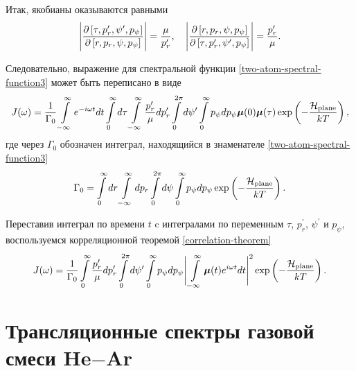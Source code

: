 Итак, якобианы оказываются равными
\begin{gather}
    \Bigg\vert \frac{\partial \left[ \tau, p_r^\prime, \psi^\prime, p_\psi \right]}{\partial \left[ r, p_r, \psi, p_\psi \right]} \Bigg\vert = \frac{\mu}{p_r^\prime}, \quad \Bigg\vert \frac{\partial \left[ r, p_r, \psi, p_\psi \right]}{\partial \left[ \tau, p_r^\prime, \psi^\prime, p_\psi \right]} \Bigg\vert = \frac{p_r^\prime}{\mu}.
\end{gather}

Следовательно, выражение для спектральной функции \eqref{two-atom-spectral-function3} может быть переписано в виде
\begin{gather}
    J(\omega) = \frac{1}{\Gamma_0} \int\limits_{-\infty}^\infty e^{-i \omega t} dt \int\limits_0^\infty d\tau \int\limits_{-\infty}^\infty \frac{p_r^\prime}{\mu} dp_r^\prime \int\limits_0^{2\pi} d\psi^\prime \int\limits_0^\infty p_\psi dp_\psi \boldsymbol{\mu}(0) \boldsymbol{\mu}(\tau) \exp \left( -\frac{\mathcal{H}_\text{plane}}{kT} \right),
\end{gather}
%
где через $\Gamma_0$ обозначен интеграл, находящийся в знаменателе \eqref{two-atom-spectral-function3}
\begin{gather}
    \Gamma_0 = \int\limits_0^\infty dr \int\limits_{-\infty}^\infty dp_r \int\limits_0^{2\pi} d\psi \int\limits_0^\infty p_\psi dp_\psi \exp \left( -\frac{\mathcal{H}_\text{plane}}{kT} \right).
\end{gather}

Переставив интеграл по времени $t$ c интегралами по переменным $\tau$, $p_r^\prime$, $\psi^\prime$ и $p_\psi$, воспользуемся корреляционной теоремой \eqref{correlation-theorem}
\begin{gather}
    J(\omega) = \frac{1}{\Gamma_0} \int\limits_0^\infty \frac{p_r^\prime}{\mu} dp_r^\prime \int\limits_0^{2\pi} d\psi^\prime \int\limits_0^\infty p_\psi dp_\psi \Bigg\vert \int\limits_{-\infty}^\infty \boldsymbol{\mu}(t) e^{i \omega t} dt \Bigg\vert^2 \exp \left( -\frac{\mathcal{H}_\text{plane}}{k T} \right). \label{two-atom-spectral-function4}
\end{gather}

\section{Трансляционные спектры газовой смеси He$-$Ar}

